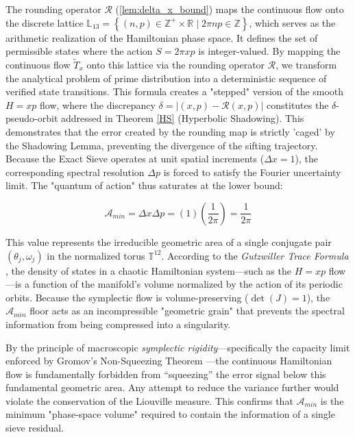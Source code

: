 \documentclass[sn-mathphys-num, pdflatex, referee]{sn-jnl}
\begin{document}
The rounding operator $\mathcal{R}$ (\ref{lem:delta_x_bound}) maps the continuous flow onto the discrete lattice $\mathbb{L}_{13}=\left\{ (n, p) \in \mathbb{Z}^{+} \times \mathbb{R} \mid 2\pi np \in \mathbb{Z} \right\}$, which serves as the arithmetic realization of the Hamiltonian phase space. It defines the set of permissible states where the action $S = 2\pi xp$ is integer-valued. By mapping the continuous flow $\tilde{T}_x$ onto this lattice via the rounding operator $\mathcal{R}$, we transform the analytical problem of prime distribution into a deterministic sequence of verified state transitions. This formula creates a "stepped" version of the smooth $H=xp$ flow, where the discrepancy $\delta = | (x, p) - \mathcal{R}(x, p) |$ constitutes the $\delta$-pseudo-orbit addressed in Theorem \ref{HS} (Hyperbolic Shadowing). This demonstrates that the error created by the rounding map is strictly 'caged' by the Shadowing Lemma, preventing the divergence of the sifting trajectory. Because the Exact Sieve operates at unit spatial increments ($\Delta x = 1$), the corresponding spectral resolution $\Delta p$ is forced to satisfy the Fourier uncertainty limit. The "quantum of action" thus saturates at the lower bound:  

\begin{equation}
\label{A_min}
\mathcal{A}_{min} = \Delta x \Delta p = (1)\left(\frac{1}{2\pi}\right) = \frac{1}{2\pi}\end{equation} 

This value represents the irreducible geometric area of a single conjugate pair $(\theta_j, \omega_j)$ in the normalized torus $\mathbb{T}^{12}$. According to the \textit{Gutzwiller Trace Formula} \cite{gutzwiller}, the density of states in a chaotic Hamiltonian system—such as the $H=xp$ flow—is a function of the manifold's volume normalized by the action of its periodic orbits. Because the symplectic flow is volume-preserving ($\det(J)=1$), the $\mathcal{A}_{min}$ floor acts as an incompressible "geometric grain" that prevents the spectral information from being compressed into a singularity. 

By the principle of macroscopic \textit{symplectic rigidity}---specifically the capacity limit enforced by Gromov's Non-Squeezing Theorem \cite{gromov}---the continuous Hamiltonian flow is fundamentally forbidden from ``squeezing'' the error signal below this fundamental geometric area. Any attempt to reduce the variance further would violate the conservation of the Liouville measure. This confirms that $\mathcal{A}_{min}$ is the minimum "phase-space volume" required to contain the information of a single sieve residual.
\end{document}
